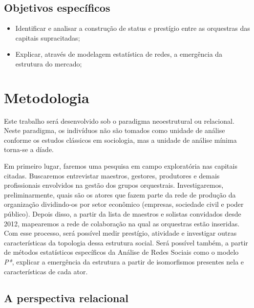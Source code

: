 \documentclass[a4paper, 12pt, openright, oneside, german, french, english, brazil, article]{abntex2}
\begin{document}
\subsection{Objetivos específicos}
\begin{itemize}
\item Identificar e analisar a construção de status e prestígio entre as orquestras das capitais supracitadas;
\item Explicar, através de modelagem estatística de redes, a emergência da estrutura do mercado;
\end{itemize}


\section{Metodologia}

Este trabalho será desenvolvido sob o paradigma neoestrutural ou relacional. Neste paradigma, os indivíduos não são tomados como unidade de análise conforme os estudos clássicos em sociologia, mas a unidade de análise mínima torna-se a díade.

Em primeiro lugar, faremos uma pesquisa em campo exploratória nas capitais citadas. Buscaremos entrevistar maestros, gestores, produtores e demais profissionais envolvidos na gestão dos grupos orquestrais. Investigaremos, preliminarmente, quais são os atores que fazem parte da rede de produção da organização dividindo-os por setor econômico (empresas, sociedade civil e poder público). Depois disso, a partir da lista de maestros e solistas convidados desde 2012, mapearemos a rede de colaboração na qual as orquestras estão inseridas. Com esse processo, será possível medir prestígio, atividade e investigar outras características da topologia dessa estrutura social. Será possível também, a partir de métodos estatísticos específicos da Análise de Redes Sociais como o modelo \textit{P*}, explicar a emergência da estrutura a partir de isomorfismos presentes nela e características de cada ator.

\subsection{A perspectiva relacional}
\end{document}
